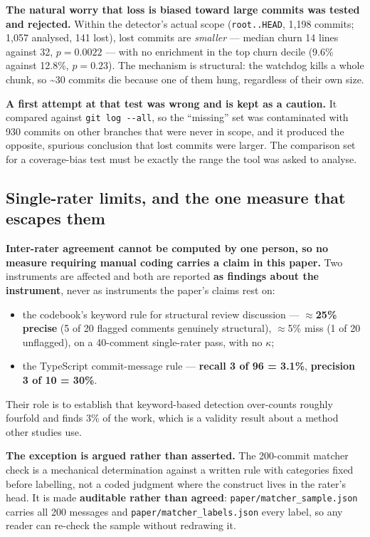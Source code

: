 \documentclass[conference]{IEEEtran}
\begin{document}
\textbf{The natural worry that loss is biased toward large commits was tested and rejected.} Within the detector's actual scope (\texttt{root.\allowbreak{}.\allowbreak{}HEAD}, 1,198 commits; 1,057 analysed, 141 lost), lost commits are \emph{smaller} --- median churn 14 lines against 32, $p=0.0022$ --- with no enrichment in the top churn decile (9.6\% against 12.8\%, $p=0.23$). The mechanism is structural: the watchdog kills a whole chunk, so \textasciitilde{}30 commits die because one of them hung, regardless of their own size.

\textbf{A first attempt at that test was wrong and is kept as a caution.} It compared against \texttt{git log -\allowbreak{}-\allowbreak{}all}, so the ``missing'' set was contaminated with 930 commits on other branches that were never in scope, and it produced the opposite, spurious conclusion that lost commits were larger. The comparison set for a coverage-bias test must be exactly the range the tool was asked to analyse.

\subsection{Single-rater limits, and the one measure that escapes them}
\label{sec:6.5}

\textbf{Inter-rater agreement cannot be computed by one person, so no measure requiring manual coding carries a claim in this paper.} Two instruments are affected and both are reported \textbf{as findings about the instrument}, never as instruments the paper's claims rest on:

\begin{itemize}
\item the codebook's keyword rule for structural review discussion --- \textbf{$\approx$25\% precise} (5 of 20 flagged comments genuinely structural), $\approx$5\% miss (1 of 20 unflagged), on a 40-comment single-rater pass, with no $\kappa$;
\item the TypeScript commit-message rule --- \textbf{recall 3 of 96 = 3.1\%}, \textbf{precision 3 of 10 = 30\%}.
\end{itemize}

Their role is to establish that keyword-based detection over-counts roughly fourfold and finds 3\% of the work, which is a validity result about a method other studies use.

\textbf{The exception is argued rather than asserted.} The 200-commit matcher check is a mechanical determination against a written rule with categories fixed before labelling, not a coded judgment where the construct lives in the rater's head. It is made \textbf{auditable rather than agreed}: \texttt{paper/\allowbreak{}matcher\_\allowbreak{}sample.\allowbreak{}json} carries all 200 messages and \texttt{paper/\allowbreak{}matcher\_\allowbreak{}labels.\allowbreak{}json} every label, so any reader can re-check the sample without redrawing it.
\end{document}
